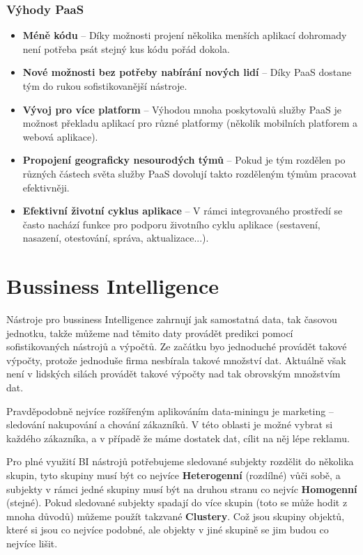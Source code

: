 \subsubsection{Výhody PaaS} 
\begin{itemize}
  \item \textbf{Méně kódu} -- Díky možnosti projení několika menších aplikací dohromady není potřeba psát stejný kus kódu pořád dokola.
  \item \textbf{Nové možnosti bez potřeby nabírání nových lidí} -- Díky PaaS dostane tým do rukou sofistikovanější nástroje.
  \item \textbf{Vývoj pro více platform} -- Výhodou mnoha poskytovalů služby PaaS je možnost překladu aplikací pro různé platformy (několik mobilních platforem a webová aplikace).
  \item \textbf{Propojení geograficky nesourodých týmů} -- Pokud je tým rozdělen po různých částech světa služby PaaS dovolují takto rozděleným týmům pracovat efektivněji.
  \item \textbf{Efektivní životní cyklus aplikace} -- V rámci integrovaného prostředí se často nachází funkce pro podporu životního cyklu aplikace (sestavení, nasazení, otestování, správa, aktualizace...). \cite{co-je-paas}
\end{itemize}

\section{Bussiness Intelligence}
\par Nástroje pro bussiness Intelligence zahrnují jak samostatná data, tak časovou jednotku, takže můžeme nad těmito daty provádět predikci pomocí sofistikovaných nástrojů a výpočtů. Ze začátku byo jednoduché provádět takové výpočty, protože jednoduše firma nesbírala takové množství dat. Aktuálně však není v lidských silách provádět takové výpočty nad tak obrovským množstvím dat. \cite{data-science-business}

\par Pravděpodobně nejvíce rozšířeným aplikováním data-miningu je marketing -- sledování nakupování a chování zákazníků. V této oblasti je možné vybrat si každého zákazníka, a v případě že máme dostatek dat, cílit na něj lépe reklamu. \cite{data-science-business}

\par Pro plné využití BI nástrojů potřebujeme sledované subjekty rozdělit do několika skupin, tyto skupiny musí být co nejvíce \textbf{Heterogenní} (rozdílné) vůči sobě, a subjekty v rámci jedné skupiny musí být na druhou stranu co nejvíc \textbf{Homogenní} (stejné). Pokud sledované subjekty spadají do více skupin (toto se může hodit z mnoha důvodů) můžeme použít takzvané  \textbf{Clustery}. Což jsou skupiny objektů, které si jsou co nejvíce podobné, ale objekty v jiné skupině se jim budou co nejvíce lišit. \cite{data-science-business}

